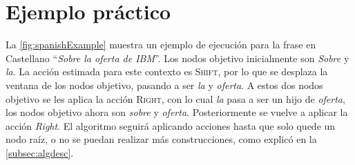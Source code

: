 \section{Ejemplo práctico}
\label{sec:example}

La \autoref{fig:spanishExample} muestra un ejemplo de ejecución para la frase en
Castellano ``\emph{Sobre la oferta de IBM}''. Los nodos objetivo inicialmente
son \emph{Sobre} y \emph{la}. La acción estimada para este contexto es
\textsc{Shift}, por lo que se desplaza la ventana de los nodos objetivo, pasando
a ser \emph{la} y \emph{oferta}. A estos dos nodos objetivo se les aplica la
acción \textsc{Right}, con lo cual \emph{la} pasa a ser un hijo de
\emph{oferta}, los nodos objetivo ahora son \emph{sobre} y
\emph{oferta}. Posteriormente se vuelve a aplicar la acción \emph{Right}. El
algoritmo seguirá aplicando acciones hasta que solo quede un nodo raíz, o no se
puedan realizar más construcciones, como explicó en la \autoref{subsec:algdesc}.

